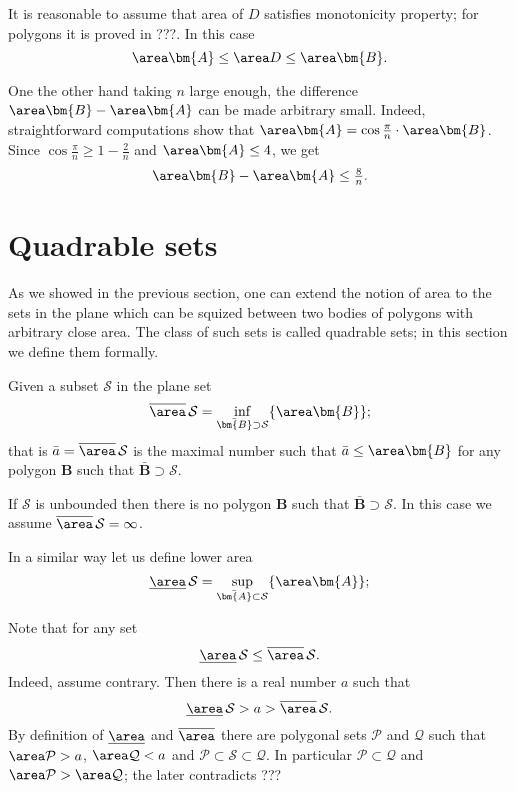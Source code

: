 It is reasonable to assume that area of $D$ satisfies monotonicity property;
for polygons it is proved in ???.
In this case 
\[\area\bm{A}\le\area D\le \area\bm{B}.\]

One the other hand taking $n$ large enough, 
the difference $\area\bm{B}-\area\bm{A}$ can be made arbitrary small.
Indeed, straightforward computations show that
$\area\bm{A}=\cos\tfrac\pi n\cdot\area\bm{B}$. 
Since $\cos\tfrac\pi n\ge 1-\tfrac2n $ and $\area \bm{A}\le 4$,
we get
\[\area\bm{B}-\area\bm{A}\le \tfrac8n.\]










\section*{Quadrable sets}

As we showed in the previous section,
one can extend the notion of area to the sets in the plane which can be squized between two bodies of polygons with arbitrary close area.
The class of such sets is called quadrable sets;
in this section we define them formally.

Given a subset  $\mathcal{S}$ in the plane
set
\[\overline\area\,\mathcal{S}=\inf_{\bar{\bm{B}}\supset \mathcal{S}}\{\area\bm{B}\};\]
that is $\bar a=\overline\area\,\mathcal{S}$ is the maximal number such that $\bar a\le \area\bm{B}$ for any polygon $\bm{B}$ such that $\bar{\bm{B}}\supset \mathcal{S}$.

If $\mathcal{S}$ is unbounded
then there is no polygon $\bm{B}$ such that $\bar{\bm{B}}\supset \mathcal{S}$.
In this case we assume $\overline\area\,\mathcal{S}=\infty$.

In a similar way let us define lower area 
\[\underline\area\,\mathcal{S}=\sup_{\bar{\bm{A}}\subset \mathcal{S}}\{\area\bm{A}\};\]

Note that for any set 
\[\underline\area\,\mathcal{S}\le\overline\area\,\mathcal{S}.\]
Indeed, assume contrary. Then there is a real number $a$ such that 
\[\underline\area\,\mathcal{S}>a>\overline\area\,\mathcal{S}.\]
By definition of $\underline\area$ and $\overline\area$ there are 
polygonal sets $\mathcal{P}$ and $\mathcal{Q}$ 
such that $\area\mathcal{P}>a$, $\area \mathcal{Q}<a$
and $\mathcal{P}\subset \mathcal{S}\subset\mathcal{Q}$.
In particular $\mathcal{P}\subset \mathcal{Q}$ 
and $\area\mathcal{P}>\area \mathcal{Q}$;
the later contradicts ???

